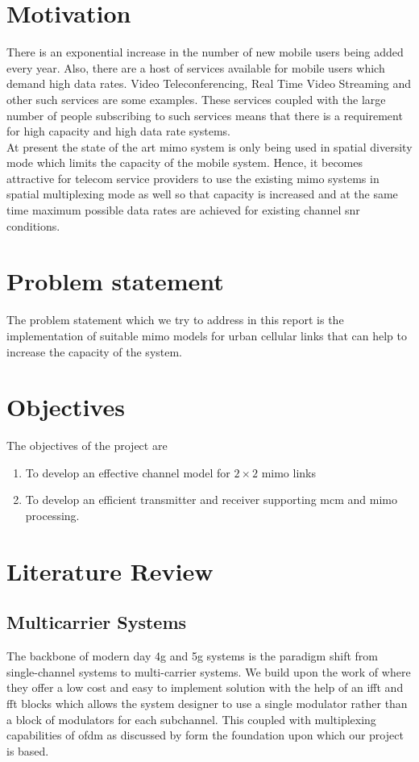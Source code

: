 \section[Motivation]{\textbf{Motivation}}
There is an exponential increase in the number of new mobile users being added every year. Also, there are a host of services available for mobile users which demand high data rates. Video Teleconferencing, Real Time Video Streaming and other such services are some examples. These services coupled with the large number of people subscribing to such services means that there is a requirement for high capacity and high data rate systems.\\

At present the state of the art \acrshort{mimo} system is only being used in \gls{spatial diversity} mode which limits the capacity of the mobile system. Hence, it becomes attractive for telecom service providers to use the existing \acrshort{mimo} systems in \gls{spatial multiplexing} mode as well so that capacity is increased and at the same time maximum possible data rates are achieved for existing channel \acrshort{snr} conditions.  

\section[Problem statement]{\textbf{Problem statement}}
The problem statement which we try to address in this report is the implementation of suitable \acrshort{mimo} models for urban cellular links that can help to increase the capacity of the system.

\section[Objectives]{\textbf{Objectives}}
The objectives of the project are
\begin{enumerate}
\item To develop an effective channel model for $2 \times 2$ \acrshort{mimo} links
\item To develop an efficient transmitter and receiver supporting \acrshort{mcm} and \acrshort{mimo} processing.
\end{enumerate}

\section{Literature Review}

\subsection{Multicarrier Systems}
The backbone of modern day \acrshort{4g} and \acrshort{5g} systems is the paradigm shift from single-channel systems to multi-carrier systems. We build upon the work of \textcite{Weinstein1971} where they offer a low cost and easy to implement solution with the help of an \acrshort{ifft} and \acrshort{fft} blocks which allows the system designer to use a single modulator rather than a block of modulators for each subchannel. This coupled with multiplexing capabilities of \acrshort{ofdm} as discussed by \textcite{Wu1995} form the foundation upon which our project is based.
 
